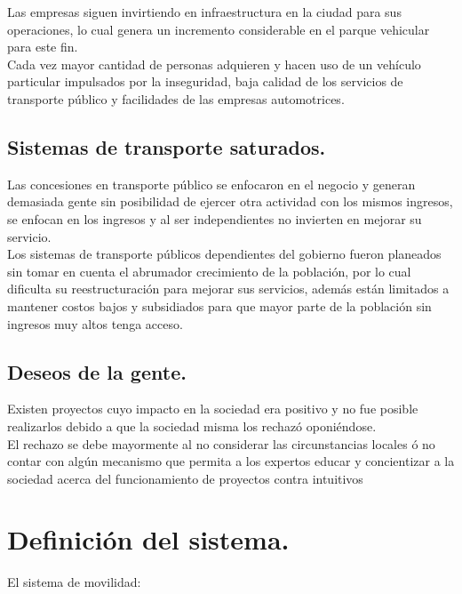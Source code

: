 \documentclass[10pt]{article}
\begin{document}
Las empresas siguen invirtiendo en infraestructura en la ciudad para sus operaciones, lo cual genera un incremento considerable en el parque vehicular para este fin. \\

Cada vez mayor cantidad de personas adquieren y hacen uso de un vehículo particular impulsados por la inseguridad, baja calidad de los servicios de transporte público y facilidades de las empresas  automotrices.

\subsection{Sistemas de transporte saturados.}

Las concesiones en transporte público se enfocaron en el  negocio y generan demasiada gente sin posibilidad de ejercer otra actividad con los mismos ingresos, se enfocan en los ingresos y al ser independientes no invierten en mejorar su servicio. \\

Los sistemas de transporte públicos dependientes del gobierno fueron planeados sin tomar en cuenta el abrumador crecimiento de la población, por lo cual dificulta su reestructuración para mejorar sus servicios, además están limitados a  mantener costos bajos y subsidiados para que mayor parte de la población sin ingresos muy altos tenga acceso. 


\subsection{Deseos de la gente.}
Existen proyectos cuyo impacto en la sociedad era positivo y no fue posible realizarlos debido a que la sociedad misma los rechazó oponiéndose.\\

El rechazo se debe mayormente al no considerar las circunstancias locales ó no contar con algún mecanismo que permita a los expertos educar y concientizar a la sociedad acerca del funcionamiento de proyectos contra intuitivos 
\newpage
\section{Definición del sistema.}
El sistema de movilidad:
\end{document}
